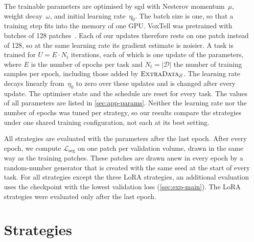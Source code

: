 The trainable parameters are optimised by \gls{sgd} with Nesterov momentum~$\mu$, weight decay~$\omega$, and initial learning rate~$\eta_0$.
The batch size is one, so that a training step fits into the memory of one GPU.
VoxTell was pretrained with batches of 128 patches~\cite[Sec.~5]{rokuss2025voxtellfreetextpromptableuniversal}.
Each of our updates therefore rests on one patch instead of 128, so at the same learning rate its gradient estimate is noisier.
A task is trained for $U = E \cdot N_t$ iterations, each of which is one update of the parameters, where $E$ is the number of epochs per task and $N_t = |\mathcal{D}|$ the number of training samples per epoch, including those added by $\textsc{ExtraData}_{\mathcal{S}}$.
The learning rate decays linearly from~$\eta_0$ to zero over these updates and is changed after every update.
The optimiser state and the schedule are reset for every task.
The values of all parameters are listed in \cref{sec:app-params}.
Neither the learning rate nor the number of epochs was tuned per strategy, so our results compare the strategies under one shared training configuration, not each at its best setting.

All strategies are evaluated with the parameters after the last epoch.
After every epoch, we compute $\mathcal{L}_{\mathrm{seg}}$ on one patch per validation volume, drawn in the same way as the training patches.
These patches are drawn anew in every epoch by a random-number generator that is created with the same seed at the start of every task.
For all strategies except the three LoRA strategies, an additional evaluation uses the checkpoint with the lowest validation loss (\cref{sec:exp-main}).
The LoRA strategies were evaluated only after the last epoch.

\section{Strategies}
\label{sec:method-strategies}

